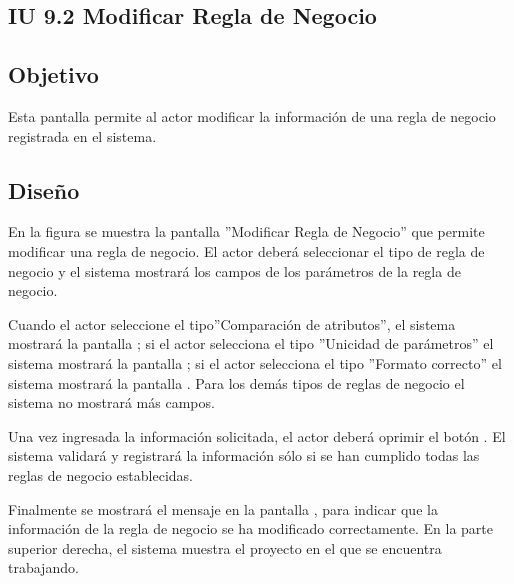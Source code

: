 \subsection{IU 9.2 Modificar Regla de Negocio}

\subsection{Objetivo}
	Esta pantalla permite al actor modificar la información de una regla de negocio registrada en el sistema.
\subsection{Diseño}
	En la figura  se muestra la pantalla ''Modificar Regla de Negocio'' que permite modificar una regla de negocio. El actor deberá seleccionar el tipo de regla de negocio y el sistema mostrará los campos de los parámetros de la regla de negocio.
	
	Cuando el actor seleccione el tipo''Comparación de atributos'', el sistema mostrará la pantalla ; si el actor selecciona el tipo ''Unicidad de parámetros'' el sistema mostrará la pantalla ; si el actor selecciona el tipo ''Formato correcto'' el sistema mostrará la pantalla . Para los demás tipos de reglas de negocio el sistema no mostrará más campos.
	
	Una vez ingresada la información solicitada, el actor deberá oprimir el botón . El sistema validará y registrará la información sólo si se han cumplido todas las reglas de negocio establecidas.
	
	Finalmente se mostrará el mensaje  en la pantalla , para indicar que la información de la regla de negocio se ha modificado correctamente.
	En la parte superior derecha, el sistema muestra el proyecto en el que se encuentra trabajando.

